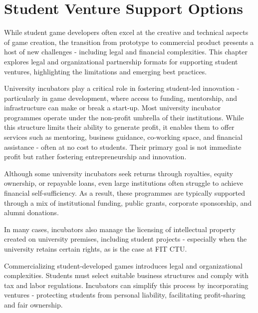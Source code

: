 \chapter{Student Venture Support Options}\label{chap:support-options}

\begin{chapterabstract}
    While student game developers often excel at the creative and technical aspects of game creation, the transition from prototype to commercial product presents a host of new challenges - including legal and financial complexities. This chapter explores legal and organizational partnership formats for supporting student ventures, highlighting the limitations and emerging best practices.
\end{chapterabstract}

University incubators play a critical role in fostering student-led innovation - particularly in game development, where access to funding, mentorship, and infrastructure can make or break a start-up. Most university incubator programmes operate under the non-profit umbrella of their institutions. While this structure limits their ability to generate profit, it enables them to offer services such as mentoring, business guidance, co-working space, and financial assistance - often at no cost to students. Their primary goal is not immediate profit but rather fostering entrepreneurship and innovation.

Although some university incubators seek returns through royalties, equity ownership, or repayable loans, even large institutions often struggle to achieve financial self-sufficiency. As a result, these programmes are typically supported through a mix of institutional funding, public grants, corporate sponsorship, and alumni donations.

In many cases, incubators also manage the licensing of intellectual property created on university premises, including student projects - especially when the university retains certain rights, as is the case at FIT CTU. 

Commercializing student-developed games introduces legal and organizational complexities. Students must select suitable business structures and comply with tax and labor regulations. Incubators can simplify this process by incorporating ventures - protecting students from personal liability, facilitating profit-sharing and fair ownership.

